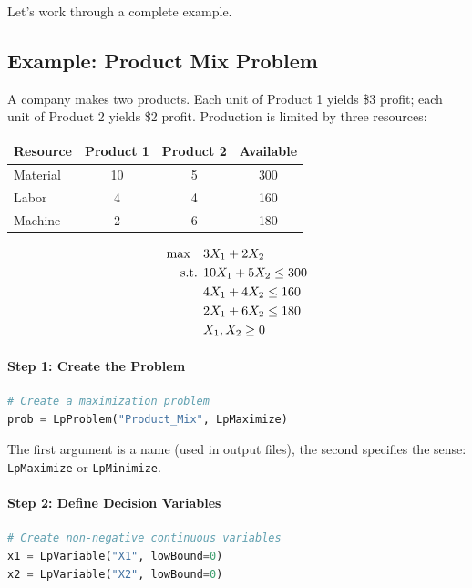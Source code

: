 Let's work through a complete example.

\subsection{Example: Product Mix Problem}
\label{sec:pulp-product-mix}

A company makes two products. Each unit of Product 1 yields \$3 profit; each unit of Product 2 yields \$2 profit. Production is limited by three resources:

\begin{center}
\begin{tabular}{lccc}
\toprule
Resource & Product 1 & Product 2 & Available \\
\midrule
Material & 10 & 5 & 300 \\
Labor & 4 & 4 & 160 \\
Machine & 2 & 6 & 180 \\
\bottomrule
\end{tabular}
\end{center}

\begin{align*}
\max \quad & 3X_1 + 2X_2 \\
\text{ s.t. }        & 10X_1 + 5X_2 \leq 300 \\
& 4X_1 + 4X_2 \leq 160 \\
& 2X_1 + 6X_2 \leq 180 \\
& X_1, X_2 \geq 0
\end{align*}

\paragraph{Step 1: Create the Problem}

\begin{lstlisting}[language=Python]
# Create a maximization problem
prob = LpProblem("Product_Mix", LpMaximize)
\end{lstlisting}

The first argument is a name (used in output files), the second specifies the sense: \texttt{LpMaximize} or \texttt{LpMinimize}.

\paragraph{Step 2: Define Decision Variables}

\begin{lstlisting}[language=Python]
# Create non-negative continuous variables
x1 = LpVariable("X1", lowBound=0)
x2 = LpVariable("X2", lowBound=0)
\end{lstlisting}

